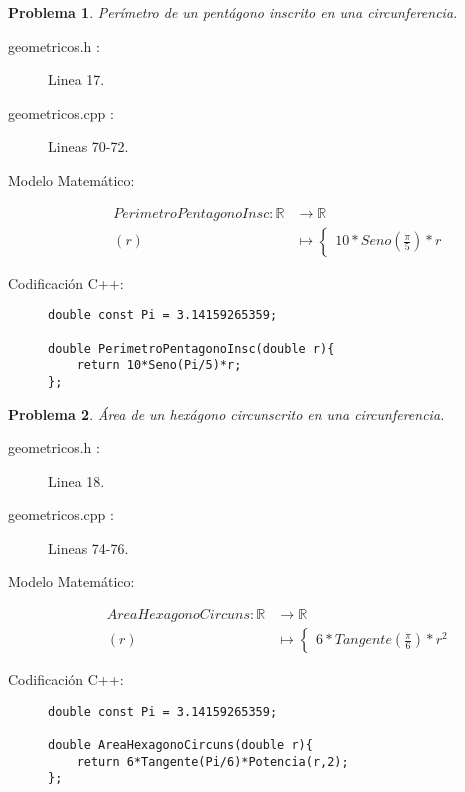 \documentclass{article}
\theoremstyle{plain}
\theoremstyle{definition}
\newtheorem{problem}{Problema}
\begin{document}
\begin{problem} \emph{Perímetro de un pentágono inscrito en una circunferencia.}\\
\begin{description}
\item[geometricos.h :] Linea 17. \item[geometricos.cpp :] Lineas 70-72.

\item[Modelo Matemático:]
\begin{align*}
PerimetroPentagonoInsc: \mathbb{R} &\to \mathbb{R}\\
(r) &\mapsto \begin{cases}
10*Seno(\frac{\pi}{5})*r
\end{cases}
\end{align*}
%
\item[Codificación \textsf{C++}:]\hfill
%
\begin{verbatim}
double const Pi = 3.14159265359;

double PerimetroPentagonoInsc(double r){
    return 10*Seno(Pi/5)*r;
};
\end{verbatim}
\end{description}
\end{problem}

\begin{problem} \emph{Área de un hexágono circunscrito en una circunferencia.}\\
\begin{description}
\item[geometricos.h :] Linea 18. \item[geometricos.cpp :] Lineas 74-76.

\item[Modelo Matemático:]
\begin{align*}
AreaHexagonoCircuns: \mathbb{R} &\to \mathbb{R}\\
(r) &\mapsto \begin{cases}
6*Tangente(\frac{\pi}{6})*r^{2}
\end{cases}
\end{align*}
%
\item[Codificación \textsf{C++}:]\hfill
%
\begin{verbatim}
double const Pi = 3.14159265359;

double AreaHexagonoCircuns(double r){
    return 6*Tangente(Pi/6)*Potencia(r,2);
};
\end{verbatim}
\end{description}
\end{problem}
\end{document}
